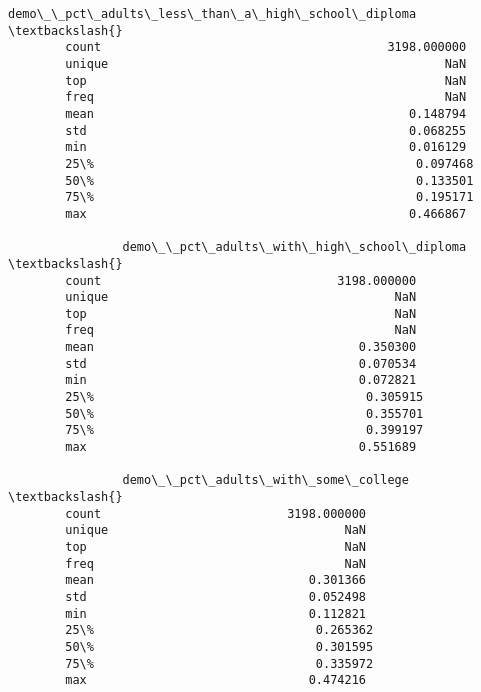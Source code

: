 \documentclass[11pt]{article}
\begin{document}
\begin{Verbatim}[commandchars=\\\{\}]
                demo\_\_pct\_adults\_less\_than\_a\_high\_school\_diploma  \textbackslash{}
        count                                        3198.000000   
        unique                                               NaN   
        top                                                  NaN   
        freq                                                 NaN   
        mean                                            0.148794   
        std                                             0.068255   
        min                                             0.016129   
        25\%                                             0.097468   
        50\%                                             0.133501   
        75\%                                             0.195171   
        max                                             0.466867   
        
                demo\_\_pct\_adults\_with\_high\_school\_diploma  \textbackslash{}
        count                                 3198.000000   
        unique                                        NaN   
        top                                           NaN   
        freq                                          NaN   
        mean                                     0.350300   
        std                                      0.070534   
        min                                      0.072821   
        25\%                                      0.305915   
        50\%                                      0.355701   
        75\%                                      0.399197   
        max                                      0.551689   
        
                demo\_\_pct\_adults\_with\_some\_college  \textbackslash{}
        count                          3198.000000   
        unique                                 NaN   
        top                                    NaN   
        freq                                   NaN   
        mean                              0.301366   
        std                               0.052498   
        min                               0.112821   
        25\%                               0.265362   
        50\%                               0.301595   
        75\%                               0.335972   
        max                               0.474216   
        

\end{Verbatim}
\end{document}
